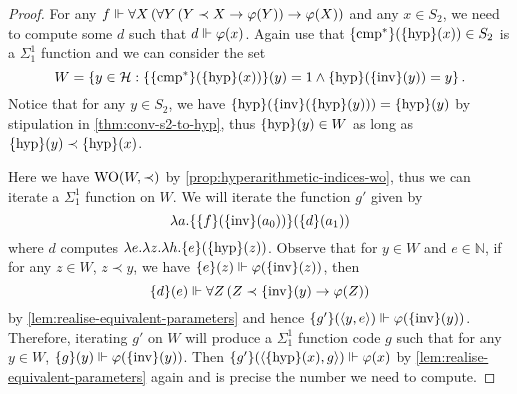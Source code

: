 \documentclass[11pt]{article}
\theoremstyle{plain}
\theoremstyle{definition}
\newcommand{\tuple}[1]{\left\langle #1 \right\rangle}
\DeclareMathOperator{\WO}{WO}
\begin{document}
\begin{proof}
    For any $f \Vdash \forall X \left(\forall Y \left(Y \prec X \rightarrow \varphi\mleft(Y\mright)\right) \rightarrow \varphi\mleft(X\mright)\right)$ and any $x \in S_2$, we need to compute some $d$ such that $d \Vdash \varphi\mleft(x\mright)$. Again use that $\mleft\{\mathrm{cmp}^*\mright\}\mleft(\mleft\{\mathrm{hyp}\mright\}\mleft(x\mright)\mright) \in S_2$ is a $\Sigma^1_1$ function and we can consider the set
    \[W = \left\{y \in \mathcal{H} : \mleft\{\mleft\{\mathrm{cmp}^*\mright\}\mleft(\mleft\{\mathrm{hyp}\mright\}\mleft(x\mright)\mright)\mright\}\mleft(y\mright) = 1 \land \mleft\{\mathrm{hyp}\mright\}\mleft(\mleft\{\mathrm{inv}\mright\}\mleft(y\mright)\mright) = y\right\}.\]
    Notice that for any $y \in S_2$, we have $\mleft\{\mathrm{hyp}\mright\}\mleft(\mleft\{\mathrm{inv}\mright\}\mleft(\mleft\{\mathrm{hyp}\mright\}\mleft(y\mright)\mright)\mright) = \mleft\{\mathrm{hyp}\mright\}\mleft(y\mright)$ by stipulation in \autoref{thm:conv-s2-to-hyp}, thus $\mleft\{\mathrm{hyp}\mright\}\mleft(y\mright) \in W$ as long as $\mleft\{\mathrm{hyp}\mright\}\mleft(y\mright) \prec \mleft\{\mathrm{hyp}\mright\}\mleft(x\mright)$.

    Here we have $\WO\mleft(W, \prec\mright)$ by \autoref{prop:hyperarithmetic-indices-wo}, thus we can iterate a $\Sigma^1_1$ function on $W$. We will iterate the function $g'$ given by
    \[\lambda a. \mleft\{\mleft\{f\mright\}\mleft(\mleft\{\mathrm{inv}\mright\}\mleft(a_0\mright)\mright)\mright\}\mleft(\mleft\{d\mright\}\mleft(a_1\mright)\mright)\]
    where $d$ computes $\lambda e. \lambda z. \lambda h. \mleft\{e\mright\}\mleft(\mleft\{\mathrm{hyp}\mright\}\mleft(z\mright)\mright)$. Observe that for $y \in W$ and $e \in \mathbb{N}$, if for any $z \in W$, $z \prec y$, we have $\mleft\{e\mright\}\mleft(z\mright) \Vdash \varphi\mleft(\mleft\{\mathrm{inv}\mright\}\mleft(z\mright)\mright)$, then
    \[\mleft\{d\mright\}\mleft(e\mright) \Vdash \forall Z \left(Z \prec \mleft\{\mathrm{inv}\mright\}\mleft(y\mright) \rightarrow \varphi\mleft(Z\mright)\right)\]
    by \autoref{lem:realise-equivalent-parameters} and hence $\mleft\{g'\mright\}\mleft(\tuple{y, e}\mright) \Vdash \varphi\mleft(\mleft\{\mathrm{inv}\mright\}\mleft(y\mright)\mright)$. Therefore, iterating $g'$ on $W$ will produce a $\Sigma^1_1$ function code $g$ such that for any $y \in W$, $\mleft\{g\mright\}\mleft(y\mright) \Vdash \varphi\mleft(\mleft\{\mathrm{inv}\mright\}\mleft(y\mright)\mright)$. Then $\mleft\{g'\mright\}\mleft(\tuple{\mleft\{\mathrm{hyp}\mright\}\mleft(x\mright), g}\mright) \Vdash \varphi\mleft(x\mright)$ by \autoref{lem:realise-equivalent-parameters} again and is precise the number we need to compute.
\end{proof}
\end{document}
